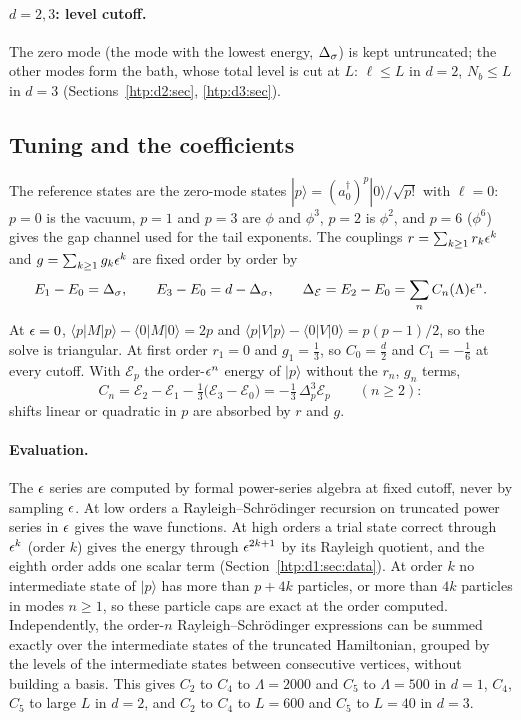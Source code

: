 \paragraph{$d=2,3$: level cutoff.} The zero mode (the mode with the lowest energy, $\Delta_\sigma$) is kept untruncated; the
other modes form the bath, whose total level is cut at $L$: $\ell\le L$ in $d=2$, $N_b\le L$ in $d=3$
(Sections~\ref{htp:d2:sec}, \ref{htp:d3:sec}).

\subsection{Tuning and the coefficients}\label{htp:sec:tuning}
The reference states are the zero-mode states $|p\rangle=(a_0^\dagger)^p|0\rangle/\sqrt{p!}$ with $\ell=0$: $p=0$ is
the vacuum, $p=1$ and $p=3$ are $\phi$ and $\phi^3$, $p=2$ is $\phi^2$, and $p=6$ ($\phi^6$) gives the gap channel used
for the tail exponents. The couplings $r=\sum_{k\ge1}r_k\epsilon^k$ and $g=\sum_{k\ge1}g_k\epsilon^k$ are fixed order by order by
\begin{equation}
 E_1-E_0=\Delta_\sigma,\qquad E_3-E_0=d-\Delta_\sigma,\qquad \Delta_{\mathcal E}=E_2-E_0=\sum_nC_n(\Lambda)\epsilon^n .
 \label{htp:eq:tune}
\end{equation}
At $\epsilon=0$, $\langle p|M|p\rangle-\langle0|M|0\rangle=2p$ and $\langle p|V|p\rangle-\langle0|V|0\rangle=p(p-1)/2$, so
the solve is triangular. At first order $r_1=0$ and $g_1=\tfrac13$, so $C_0=\tfrac d2$ and $C_1=-\tfrac16$ at every
cutoff. With $\mathcal E_p$ the order-$\epsilon^n$ energy of $|p\rangle$ without the $r_n$, $g_n$ terms,
\begin{equation}
 C_n=\mathcal E_2-\mathcal E_1-\tfrac13\big(\mathcal E_3-\mathcal E_0\big)=-\tfrac13\,\Delta_p^3\mathcal E_p\qquad(n\ge2):
 \label{htp:eq:Pi}
\end{equation}
shifts linear or quadratic in $p$ are absorbed by $r$ and $g$.

\paragraph{Evaluation.} The $\epsilon$ series are computed by formal power-series algebra at fixed cutoff, never by
sampling $\epsilon$. At low orders a Rayleigh--Schr\"odinger recursion on truncated power series in $\epsilon$ gives the wave
functions. At high orders a trial state correct through $\epsilon^k$ (order $k$) gives the energy through $\epsilon^{2k+1}$ by
its Rayleigh quotient, and the eighth order adds one scalar term (Section~\ref{htp:d1:sec:data}). At order $k$ no
intermediate state of $|p\rangle$ has more than $p+4k$ particles, or more than $4k$ particles in modes $n\ge1$, so these
particle caps are exact at the order computed. Independently, the order-$n$ Rayleigh--Schr\"odinger expressions can be
summed exactly over the intermediate states of the truncated Hamiltonian, grouped by the levels of the intermediate
states between consecutive vertices, without building a basis. This gives $C_2$ to $C_4$ to $\Lambda=2000$ and $C_5$ to
$\Lambda=500$ in $d=1$, $C_4$, $C_5$ to large $L$ in $d=2$, and $C_2$ to $C_4$ to $L=600$ and $C_5$ to $L=40$ in $d=3$.


